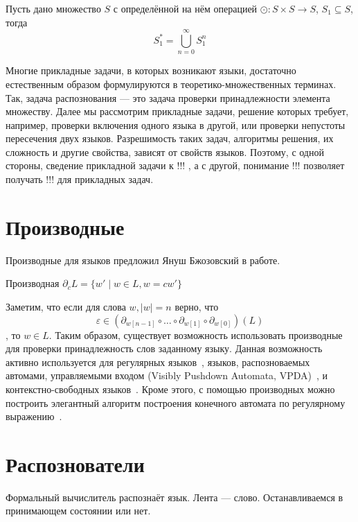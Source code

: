 \begin{definition}
Пусть дано множество $S$ с определённой на нём операцией $\odot: S \times S \to S$, $S_1 \subseteq S$, тогда 
$$
S_1 ^ * = \bigcup_{n = 0}^{\infty} S_1^n
$$
\end{definition}

Многие прикладные задачи, в которых возникают языки, достаточно естественным образом формулируются в теоретико-множественных терминах.
Так, задача распознования --- это задача проверки принадлежности элемента множеству.
Далее мы рассмотрим прикладные задачи, решение которых требует, например, проверки включения одного языка в другой, или проверки непустоты пересечения двух языков.
Разрешимость таких задач, алгоритмы решения, их сложность и другие свойства, зависят от свойств языков. 
Поэтому, с одной стороны, сведение прикладной задачи к !!! , а с другой, понимание !!! позволяет получать !!! для прикладных задач.

\section{Производные}

Производные для языков предложил Януш Бжозовский в работе\cite{10.1145/321239.321249}.

\begin{definition}
  Производная $\partial_c L = \{ w' \mid w \in L, w = cw'\}$
\end{definition}

Заметим, что если для слова $w, |w|=n$ верно, что $$\varepsilon \in (\partial_{w[n-1]} \circ \ldots \circ \partial_{w[1]}  \circ \partial_{w[0]}) (L)$$, то $w \in L$.
Таким образом, существует возможность использовать производные для проверки принадлежность слов заданному языку. 
Данная возможность активно используется для регулярных языков~\cite{!!!}, языков, распозноваемых автомами, управляемыми входом (Visibly Pushdown Automata, VPDA)~\cite{!!!}, и контекстно-свободных языков~\cite{!!!}.
Кроме этого, с помощью производных можно построить элегантный алгоритм построения конечного автомата по регулярному выражению~\cite{!!!}.


\section{Распознователи}

Формальный вычислитель распознаёт язык. Лента --- слово. Останавливаемся в принимающем состоянии или нет.






